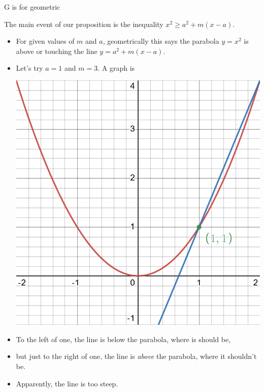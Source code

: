 \documentclass[usenames,dvipsnames,fleqn,leqno,10pt, pdflatex]{beamer}
\begin{document}
\begin{frame}{G is for geometric}

The main event of our proposition is the inequality  \(x^2 \geq a^2 + m (x-a) \).

\begin{itemize}
   \item For given values of $m$ and $a$, geometrically this says the parabola $y = x^2$ is above or touching the line \(y = a^2 + m (x-a)\).
   
   \item Let's try $a=1$ and $m=3$. A graph is
   
   \begin{center}
\includegraphics[scale=0.125]{desmos-graph(7).png}

\end{center}
\item To the left of one, the line is below the parabola, where is should be,

\item but just to the right of one, the line is \emph{above} the parabola, where it shouldn't be.

\item Apparently, the line is too steep.

\end{itemize}




\end{frame}
\end{document}
